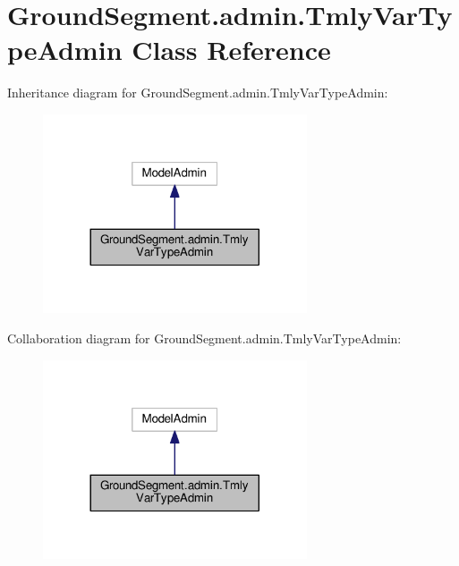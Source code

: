 \hypertarget{class_ground_segment_1_1admin_1_1_tmly_var_type_admin}{}\section{Ground\+Segment.\+admin.\+Tmly\+Var\+Type\+Admin Class Reference}
\label{class_ground_segment_1_1admin_1_1_tmly_var_type_admin}


Inheritance diagram for Ground\+Segment.\+admin.\+Tmly\+Var\+Type\+Admin\+:\nopagebreak
\begin{figure}[H]
\begin{center}
\leavevmode
\includegraphics[width=221pt]{class_ground_segment_1_1admin_1_1_tmly_var_type_admin__inherit__graph}
\end{center}
\end{figure}


Collaboration diagram for Ground\+Segment.\+admin.\+Tmly\+Var\+Type\+Admin\+:\nopagebreak
\begin{figure}[H]
\begin{center}
\leavevmode
\includegraphics[width=221pt]{class_ground_segment_1_1admin_1_1_tmly_var_type_admin__coll__graph}
\end{center}
\end{figure}
